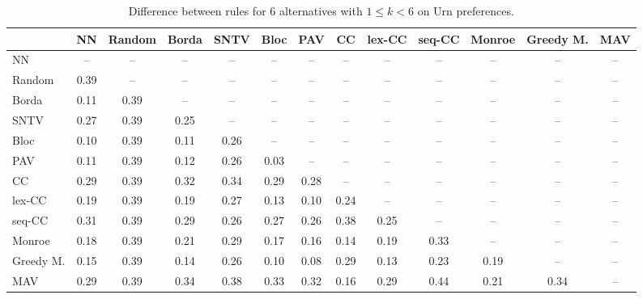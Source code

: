 
\begin{table*}[htbp]
\centering
\begin{tabular}{lcccccccccccc}
\toprule
 & NN & Random & Borda & SNTV & Bloc & PAV & CC & lex-CC & seq-CC & Monroe & Greedy M. & MAV \\
\midrule
NN & -- & -- & -- & -- & -- & -- & -- & -- & -- & -- & -- & -- \\
Random & \cellcolor{blue!39} 0.39 & -- & -- & -- & -- & -- & -- & -- & -- & -- & -- & -- \\
Borda & \cellcolor{blue!11} 0.11 & \cellcolor{blue!39} 0.39 & -- & -- & -- & -- & -- & -- & -- & -- & -- & -- \\
SNTV & \cellcolor{blue!27} 0.27 & \cellcolor{blue!39} 0.39 & \cellcolor{blue!25} 0.25 & -- & -- & -- & -- & -- & -- & -- & -- & -- \\
Bloc & \cellcolor{blue!10} 0.10 & \cellcolor{blue!39} 0.39 & \cellcolor{blue!11} 0.11 & \cellcolor{blue!26} 0.26 & -- & -- & -- & -- & -- & -- & -- & -- \\
PAV & \cellcolor{blue!11} 0.11 & \cellcolor{blue!39} 0.39 & \cellcolor{blue!12} 0.12 & \cellcolor{blue!26} 0.26 & \cellcolor{blue!3} 0.03 & -- & -- & -- & -- & -- & -- & -- \\
CC & \cellcolor{blue!28} 0.29 & \cellcolor{blue!39} 0.39 & \cellcolor{blue!32} 0.32 & \cellcolor{blue!34} 0.34 & \cellcolor{blue!28} 0.29 & \cellcolor{blue!28} 0.28 & -- & -- & -- & -- & -- & -- \\
lex-CC & \cellcolor{blue!19} 0.19 & \cellcolor{blue!39} 0.39 & \cellcolor{blue!19} 0.19 & \cellcolor{blue!27} 0.27 & \cellcolor{blue!13} 0.13 & \cellcolor{blue!10} 0.10 & \cellcolor{blue!24} 0.24 & -- & -- & -- & -- & -- \\
seq-CC & \cellcolor{blue!31} 0.31 & \cellcolor{blue!39} 0.39 & \cellcolor{blue!28} 0.29 & \cellcolor{blue!26} 0.26 & \cellcolor{blue!27} 0.27 & \cellcolor{blue!26} 0.26 & \cellcolor{blue!38} 0.38 & \cellcolor{blue!25} 0.25 & -- & -- & -- & -- \\
Monroe & \cellcolor{blue!18} 0.18 & \cellcolor{blue!39} 0.39 & \cellcolor{blue!21} 0.21 & \cellcolor{blue!28} 0.29 & \cellcolor{blue!17} 0.17 & \cellcolor{blue!16} 0.16 & \cellcolor{blue!14} 0.14 & \cellcolor{blue!19} 0.19 & \cellcolor{blue!33} 0.33 & -- & -- & -- \\
Greedy M. & \cellcolor{blue!15} 0.15 & \cellcolor{blue!39} 0.39 & \cellcolor{blue!14} 0.14 & \cellcolor{blue!26} 0.26 & \cellcolor{blue!10} 0.10 & \cellcolor{blue!8} 0.08 & \cellcolor{blue!28} 0.29 & \cellcolor{blue!13} 0.13 & \cellcolor{blue!23} 0.23 & \cellcolor{blue!19} 0.19 & -- & -- \\
MAV & \cellcolor{blue!28} 0.29 & \cellcolor{blue!39} 0.39 & \cellcolor{blue!34} 0.34 & \cellcolor{blue!38} 0.38 & \cellcolor{blue!33} 0.33 & \cellcolor{blue!32} 0.32 & \cellcolor{blue!16} 0.16 & \cellcolor{blue!28} 0.29 & \cellcolor{blue!44} 0.44 & \cellcolor{blue!21} 0.21 & \cellcolor{blue!34} 0.34 & -- \\
\bottomrule
\end{tabular}

\caption{Difference between rules for 6 alternatives with $1 \leq k < 6$ on Urn preferences.}
\label{tab:rule_distance_heatmap-m=[6]-pref_dist=URN-R}
\end{table*}
    